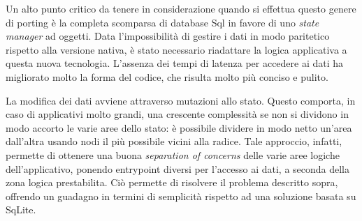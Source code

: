 Un alto punto critico da tenere in considerazione quando si effettua questo genere di porting è la completa scomparsa di database Sql in favore di uno \emph{state manager} ad oggetti. Data l'impossibilità di gestire i dati in modo paritetico rispetto alla versione nativa, è stato necessario riadattare la logica applicativa a questa nuova tecnologia. L'assenza dei tempi di latenza per accedere ai dati ha migliorato molto la forma del codice, che risulta molto più conciso e pulito.\vspace{5mm}

 La modifica dei dati avviene attraverso mutazioni allo stato. Questo comporta, in caso di applicativi molto grandi, una crescente complessità se non si dividono in modo accorto le varie aree dello stato: è possibile dividere in modo netto un'area dall'altra usando nodi il più possibile vicini alla radice. Tale approccio, infatti, permette di ottenere una buona \emph{separation of concerns}\cite{SOC} delle varie aree logiche dell'applicativo, ponendo entrypoint diversi per l'accesso ai dati, a seconda della zona logica prestabilita. Ciò permette di risolvere il problema descritto sopra, offrendo un guadagno in termini di semplicità rispetto ad una soluzione basata su SqLite.

